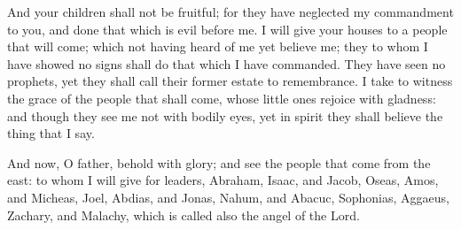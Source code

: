 {And your children shall not be fruitful; for they have neglected my commandment
 to you, and done that which is evil before me.
I will give your houses to a people that will come; which not having heard of me yet believe me; they to whom I have showed no signs shall do that which I have commanded.
They have seen no prophets, yet they shall call their former estate to remembrance.
I take to witness the grace of the people that shall come, whose little ones rejoice with gladness: and though they see me not with bodily eyes, yet in spirit they shall believe the thing that I say.
\par }{\PP {}And now, O father, behold with glory; and see the people that come from the east:
to whom I will give for leaders, Abraham, Isaac, and Jacob, Oseas, Amos, and Micheas, Joel, Abdias, and Jonas,
Nahum, and Abacuc, Sophonias, Aggaeus, Zachary, and Malachy, which is called also the angel of the Lord.

}
